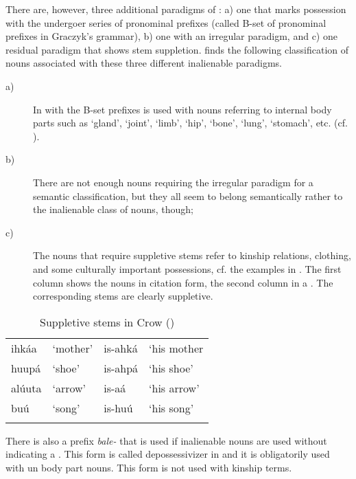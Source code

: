 \documentclass[output=paper]{LSP/langsci}
\begin{document}
There are, however, three additional paradigms of : a) one that marks possession with the undergoer series of pronominal prefixes (called B-set of pronominal prefixes in Graczyk's grammar), b) one with an irregular paradigm, and c) one residual paradigm that shows stem suppletion. \citet[57]{Graczyk2007} finds the following classification of nouns associated with these three different inalienable paradigms.

\begin{description}
\item[a)] In with the B-set prefixes is used with nouns referring to internal body parts such as `gland', `joint', `limb', `hip', `bone', `lung', `stomach', etc. (cf. \citealt[57]{Graczyk2007}).

\item[b)] There are not enough nouns requiring the irregular paradigm for a semantic classification, but they all seem to belong semantically rather to the inalienable class of nouns, though;

\item[c)] The nouns that require suppletive stems refer to kinship relations, clothing, and some culturally important possessions, cf. the examples in . The first column shows the nouns in citation form, the second column in a . The corresponding stems are clearly suppletive. 
\end{description}

\begin{table}
\caption{Suppletive stems in Crow (\citealt[58]{Graczyk2007})} \label{crowsuppletion}
\begin{tabular}[h]{ l l l l}
\lsptoprule
 ihkáa	 & `mother'	& is-ahká	& `his mother \\
 huupá & `shoe' &  is-ahpá	 &  `his shoe'\\
alúuta &  `arrow' & is-aá &  `his arrow'\\
buú & `song'	&  is-huú & `his song'\\
\lspbottomrule
\end{tabular}
\end{table}

There is also a prefix \textit{bale-} that is used if inalienable nouns are used without indicating a . This form is called depossessivizer in \citet[53/234]{Graczyk2007} and it is obligatorily used with un body part nouns. This form is not used with kinship terms.
\end{document}
